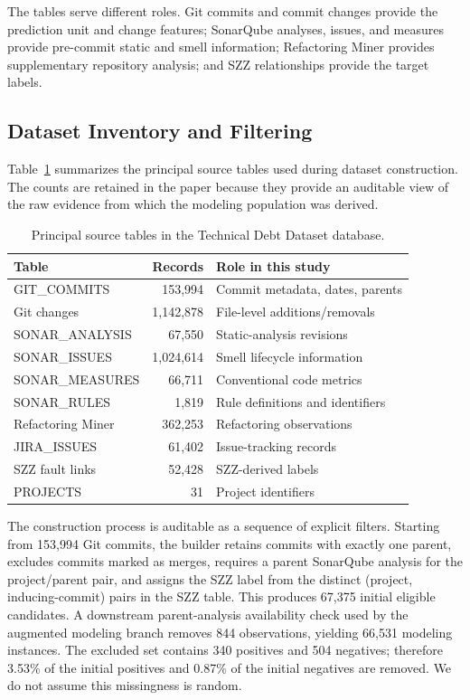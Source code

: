 \documentclass[conference]{IEEEtran}
\begin{document}
The tables serve different roles. Git commits and commit changes provide the prediction unit and change features; SonarQube analyses, issues, and measures provide pre-commit static and smell information; Refactoring Miner provides supplementary repository analysis; and SZZ relationships provide the target labels.

\subsection{Dataset Inventory and Filtering}
Table~\ref{tab:inventory} summarizes the principal source tables used during dataset construction. The counts are retained in the paper because they provide an auditable view of the raw evidence from which the modeling population was derived.

\begin{table}[t]
\centering
\caption{Principal source tables in the Technical Debt Dataset database.}
\label{tab:inventory}
\scriptsize
\begin{tabular}{p{2.35cm}r p{3.15cm}}
\toprule
Table & Records & Role in this study\\
\midrule
GIT\_COMMITS & 153,994 & Commit metadata, dates, parents\\
Git changes & 1,142,878 & File-level additions/removals\\
SONAR\_ANALYSIS & 67,550 & Static-analysis revisions\\
SONAR\_ISSUES & 1,024,614 & Smell lifecycle information\\
SONAR\_MEASURES & 66,711 & Conventional code metrics\\
SONAR\_RULES & 1,819 & Rule definitions and identifiers\\
Refactoring Miner & 362,253 & Refactoring observations\\
JIRA\_ISSUES & 61,402 & Issue-tracking records\\
SZZ fault links & 52,428 & SZZ-derived labels\\
PROJECTS & 31 & Project identifiers\\
\bottomrule
\end{tabular}
\end{table}

The construction process is auditable as a sequence of explicit filters. Starting from 153,994 Git commits, the builder retains commits with exactly one parent, excludes commits marked as merges, requires a parent SonarQube analysis for the project/parent pair, and assigns the SZZ label from the distinct (project, inducing-commit) pairs in the SZZ table. This produces 67,375 initial eligible candidates. A downstream parent-analysis availability check used by the augmented modeling branch removes 844 observations, yielding 66,531 modeling instances. The excluded set contains 340 positives and 504 negatives; therefore 3.53\% of the initial positives and 0.87\% of the initial negatives are removed. We do not assume this missingness is random.
\end{document}
